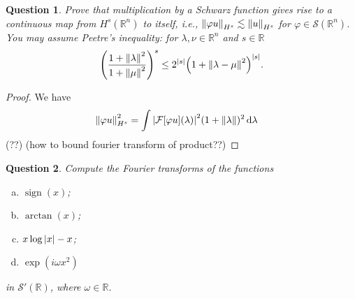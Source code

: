 \documentclass{article}
\theoremstyle{plain}
\newtheorem{question}{Question}
\theoremstyle{remark}
\renewcommand{\phi}{\varphi}
\newcommand{\Bb}{\mathbb}
\newcommand{\Cal}{\mathcal}
\newcommand{\RR}{\Bb R}
\renewcommand\SS{\Cal S}
\newcommand\FF{\Cal F}
\newcommand\les\lesssim
\DeclareMathOperator{\sign}{sign}
\begin{document}
\begin{question}
	Prove that multiplication by a Schwarz function gives rise to a continuous map from $H^s(\RR^n)$ to itself, i.e., $\norm{\phi u}_{H^s} \les \norm{u}_{H^s}$ for $\phi \in \SS(\RR^n)$. You may assume Peetre's inequality: for $\lambda, \nu \in \RR^n$ and $s \in \RR$
	\[
	\qty(\frac{1 + \norm{\lambda}^2}{1 + \norm{\mu}^2})^s \leq 2^{\abs{s}} \qty(1 + \norm{\lambda - \mu}^2)^{\abs{s}}. 
	\]
\end{question}

\begin{proof}
	We have
	\begin{align*}
		\norm{\phi u}_{H^s}^2 &= \int \abs{\FF[\phi u](\lambda)}^2 (1 + \norm{\lambda})^2 \dd{\lambda}
	\end{align*}
(??) (how to bound fourier transform of product??)
\end{proof}
\setcounter{question}{18}

\begin{question}
	Compute the Fourier transforms of the functions
	\begin{enumerate}[(a)]
		\item $\sign(x)$;
		\item $\arctan(x)$;
		\item $x\log \abs{x} - x$;
		\item $\exp(i\omega x^2)$
	\end{enumerate}
	in $\SS'(\RR)$, where $\omega \in \RR$. 
\end{question}
\end{document}
